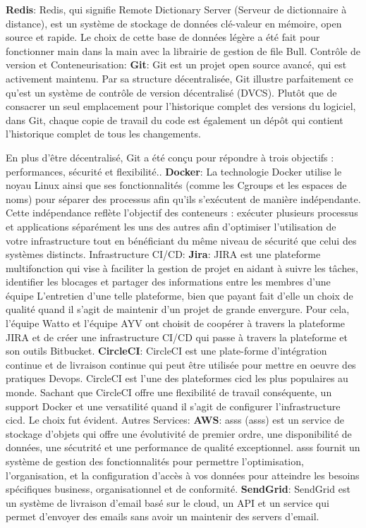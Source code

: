 \documentclass[../main.tex]{subfiles}
\begin{document}
\begin{outline}
    \2 \textbf{Redis}: Redis, qui signifie Remote Dictionary Server (Serveur de dictionnaire à distance), est un système de stockage de données clé-valeur en mémoire, open source et rapide.\cite{redis} Le choix de cette base de données légère a été fait pour fonctionner main dans la main avec la librairie de gestion de file Bull.  
 \1 Contrôle de version et Conteneurisation:
    \2 \textbf{Git}: Git est un projet open source avancé, qui est activement maintenu. Par sa structure décentralisée, Git illustre parfaitement ce qu'est un système de contrôle de version décentralisé (DVCS). Plutôt que de consacrer un seul emplacement pour l'historique complet des versions du logiciel, dans Git, chaque copie de travail du code est également un dépôt qui contient l'historique complet de tous les changements.

    En plus d'être décentralisé, Git a été conçu pour répondre à trois objectifs : performances, sécurité et flexibilité..\cite{git}
    \2 \textbf{Docker}: La technologie Docker utilise le noyau Linux ainsi que ses fonctionnalités (comme les Cgroups et les espaces de noms) pour séparer des processus afin qu'ils s'exécutent de manière indépendante. Cette indépendance reflète l'objectif des conteneurs : exécuter plusieurs processus et applications séparément les uns des autres afin d'optimiser l'utilisation de votre infrastructure tout en bénéficiant du même niveau de sécurité que celui des systèmes distincts. \cite{docker}
 \1 Infrastructure CI/CD:
    \2 \textbf{Jira}: JIRA est une plateforme multifonction qui vise à faciliter la gestion de projet en aidant à suivre les tâches, identifier les blocages et partager des informations entre les membres d'une équipe\cite{jira} L'entretien d'une telle plateforme, bien que payant fait d'elle un choix de qualité quand il s'agit de maintenir d'un projet de grande envergure. Pour cela, l'équipe Watto et l'équipe AYV ont choisit de coopérer à travers la plateforme JIRA et de créer une infrastructure CI/CD qui passe à travers la plateforme et son outils Bitbucket. 
    \2 \textbf{CircleCI}: CircleCI est une plate-forme d'intégration continue et de livraison continue qui peut être utilisée pour mettre en oeuvre des pratiques Devops. CircleCI est l'une des plateformes \acrshort{cicd} les plus populaires au monde.\cite{circleci} Sachant que CircleCI offre une flexibilité de travail conséquente, un support Docker et une versatilité quand il s'agit de configurer l'infrastructure \acrshort{cicd}. Le choix fut évident. 
 \1 Autres Services:
    \2 \textbf{AWS}: \acrlong{asss} (\acrshort{asss}) est un service de stockage d'objets qui offre une évolutivité de premier ordre, une disponibilité de données, une sécutrité et une performance de qualité exceptionnel. \acrshort{asss} fournit un système de gestion des fonctionnalités pour permettre l'optimisation, l'organisation, et la configuration d'accès à vos données pour atteindre les besoins spécifiques business, organisationnel et de conformité.\cite{aws}
    \2 \textbf{SendGrid}: SendGrid est un système de livraison d'email basé sur le cloud, un API et un service qui permet d'envoyer des emails sans avoir un maintenir des servers d'email.\cite{sendgrid}
\end{outline}
\end{document}
